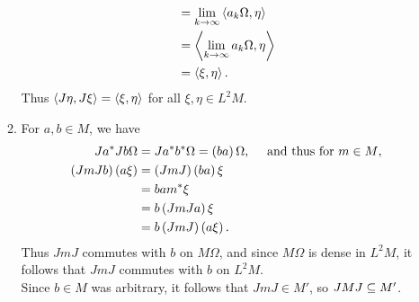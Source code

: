\documentclass[a4paper,10pt]{report}
\begin{document}
\begin{enumerate}
\begin{enumerate}
\begin{align*}
                    &= \lim_{k \to \infty} \left\langle a_k \Omega , \eta \right\rangle\\
                    &= \left\langle \lim_{k \to \infty} a_k \Omega , \eta \right\rangle\\
                    &= \left\langle \xi , \eta \right\rangle.
                  \end{align*}
                  Thus $\left\langle J \eta , J \xi \right\rangle = \left\langle \xi , \eta \right\rangle$ for all $\xi , \eta \in L^2 M$.
		\item For $a , b \in M$, we have
                  \begin{align*}
                    J a^* J b \Omega%
                    &= J a^* b^* \Omega = \E b a \R \Omega, \quad \text{ and thus for $m \in M$,}\\
                    \E J m J b \R \E a \xi \R%
                    &= \E J m J \R \E b a \R \xi\\
                    &= b a m^* \xi\\
                    &= b \E J m J a \R \xi\\
                    &= b \E J m J \R \E a \xi \R.
                  \end{align*}
                  Thus $J m J$ commutes with $b$ on $M \Omega$, and since $M \Omega$ is dense in $L^2 M$, it follows that $J m J$ commutes with $b$ on $L^2 M$.\\
                  Since $b \in M$ was arbitrary, it follows that $J m J \in M'$, so $J M J \subseteq M'$.
                  

\end{enumerate}
\end{enumerate}
\end{document}
